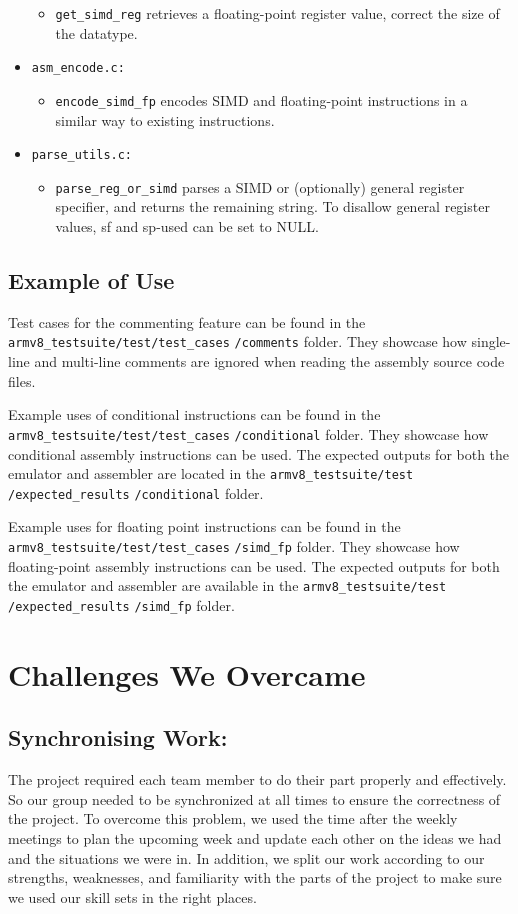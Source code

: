 \documentclass[11pt]{article}
\begin{document}
\begin{itemize}
\begin{itemize}
        \item \verb|get_simd_reg| retrieves a floating-point register value, correct the size of the datatype.
        \end{itemize}
        \item \verb|asm_encode.c:| 
        \begin{itemize}
        \item \verb|encode_simd_fp| encodes SIMD and floating-point instructions in a similar way to existing instructions.
        \end{itemize}
        \item \verb|parse_utils.c:| 
        \begin{itemize}
        \item \verb|parse_reg_or_simd| parses a SIMD or (optionally) general register specifier, and returns the remaining string. To disallow general register values, sf and sp-used can be set to NULL.
        \end{itemize}
\end{itemize}


\subsection{Example of Use}
Test cases for the commenting feature can be found in the \verb|armv8_testsuite/test/test_cases| \verb|/comments| folder. They showcase how single-line and multi-line comments are ignored when reading the assembly source code files. 

Example uses of conditional instructions can be found in the \verb|armv8_testsuite/test/test_cases|
\verb|/conditional| folder. They showcase how conditional assembly instructions can be used. The expected outputs for both the emulator and assembler are located in the \verb|armv8_testsuite/test| 
\verb|/expected_results| \verb|/conditional| folder. 

Example uses for floating point instructions can be found in the \verb|armv8_testsuite/test/test_cases| \verb|/simd_fp| folder. They showcase how floating-point assembly instructions can be used. The expected outputs for both the emulator and assembler are available in the \verb|armv8_testsuite/test| \verb|/expected_results| \verb|/simd_fp| folder.

\section{Challenges We Overcame}
\subsection{Synchronising Work:}
The project required each team member to do their part properly and effectively. So our group needed to be synchronized at all times to ensure the correctness of the project. To overcome this problem, we used the time after the weekly meetings to plan the upcoming week and update each other on the ideas we had and the situations we were in. In addition, we split our work according to our strengths, weaknesses, and familiarity with the parts of the project to make sure we used our skill sets in the right places. 
\end{document}
